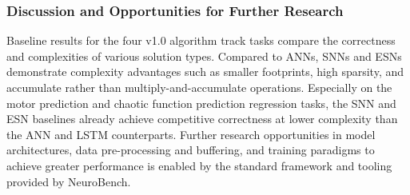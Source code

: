 \subsubsection*{Discussion and Opportunities for Further Research}
Baseline results for the four v1.0 algorithm track tasks compare the correctness and complexities of various solution types. Compared to ANNs, SNNs and ESNs demonstrate complexity advantages such as smaller footprints, high sparsity, and accumulate rather than multiply-and-accumulate operations. Especially on the motor prediction and chaotic function prediction regression tasks, the SNN and ESN baselines already achieve competitive correctness at lower complexity than the ANN and LSTM counterparts. Further research opportunities in model architectures, data pre-processing and buffering, and training paradigms to achieve greater performance is enabled by the standard framework and tooling provided by NeuroBench.